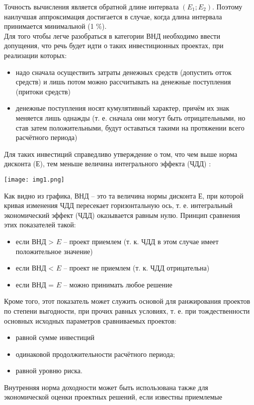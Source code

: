 \documentclass[a4paper,12pt]{article}
\begin{document}
Точность вычисления является обратной длине интервала $(E_1; E_2)$.
Поэтому наилучшая аппроксимация достигается в случае, когда длина интервала принимается минимальной (1 \%).\\
Для того чтобы легче разобраться в категории ВНД необходимо ввести допущения, что речь будет идти о таких инвестиционных проектах, при реализации которых:
\begin{itemize}
	\item надо сначала осуществить затраты денежных средств (допустить
отток средств) и лишь потом можно рассчитывать на денежные поступления (притоки средств)
	\item денежные поступления носят кумулятивный характер, причём их
знак меняется лишь однажды (т. е. сначала они могут быть отрицательными, но став затем положительными, будут оставаться такими на протяжении всего расчётного периода)
\end{itemize}
\newpage
Для таких инвестиций справедливо утверждение о том, что чем выше норма дисконта (Е), тем меньше величина интегрального эффекта
(ЧДД) :
\begin{center}
	\texttt{[image: img1.png]} 
\end{center}
Как видно из графика, ВНД – это та величина нормы дисконта Е, при
которой кривая изменения ЧДД пересекает горизонтальную ось, т. е. интегральный экономический эффект (ЧДД) оказывается равным нулю.
Принцип сравнения этих показателей такой:
\begin{itemize}
\item если ВНД > ${E}$ – проект приемлем (т. к. ЧДД в этом случае имеет положительное значение)
\item если ВНД < ${E}$ – проект не приемлем (т. к. ЧДД отрицательна)
\item если ВНД = ${E}$ – можно принимать любое решение
\end{itemize}
Кроме того, этот показатель может служить основой для ранжирования проектов по степени выгодности, при прочих равных условиях, т. е.
при тождественности основных исходных параметров сравниваемых
проектов:
\begin{itemize}
\item равной сумме инвестиций
\item одинаковой продолжительности расчётного периода;
\item равной уровню риска.
\end{itemize}
Внутренняя норма доходности может быть использована также для
экономической оценки проектных решений, если известны приемлемые
\end{document}
